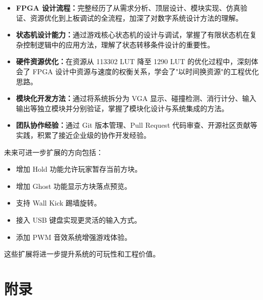 \documentclass[UTF8,zihao=-4]{ctexart}
\begin{document}
\begin{itemize}
    \item \textbf{FPGA 设计流程：}完整经历了从需求分析、顶层设计、模块实现、仿真验证、资源优化到上板调试的全流程，加深了对数字系统设计方法的理解。

    \item \textbf{状态机设计能力：}通过游戏核心状态机的设计与调试，掌握了有限状态机在复杂控制逻辑中的应用方法，理解了状态转移条件设计的重要性。

    \item \textbf{硬件资源优化：}在资源从 113302 LUT 降至 1290 LUT 的优化过程中，深刻体会了 FPGA 设计中资源与速度的权衡关系，学会了"以时间换资源"的工程优化思路。

    \item \textbf{模块化开发方法：}通过将系统拆分为 VGA 显示、碰撞检测、消行计分、输入输出等独立模块并分别验证，掌握了模块化设计与系统集成的方法。

    \item \textbf{团队协作经验：}通过 Git 版本管理、Pull Request 代码审查、开源社区贡献等实践，积累了接近企业级的协作开发经验。
\end{itemize}

未来可进一步扩展的方向包括：

\begin{itemize}
    \item 增加 Hold 功能允许玩家暂存当前方块。
    \item 增加 Ghost 功能显示方块落点预览。
    \item 支持 Wall Kick 踢墙旋转。
    \item 接入 USB 键盘实现更灵活的输入方式。
    \item 添加 PWM 音效系统增强游戏体验。
\end{itemize}

这些扩展将进一步提升系统的可玩性和工程价值。


\newpage

\section*{附录}
\end{document}
